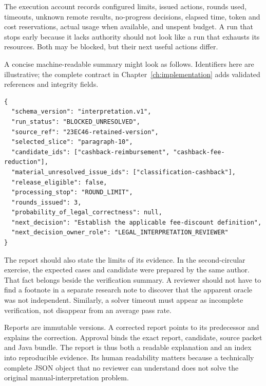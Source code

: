 
The execution account records configured limits, issued actions, rounds used,
timeouts, unknown remote results, no-progress decisions, elapsed time, token and
cost reservations, actual usage when available, and unspent budget. A run that
stops early because it lacks authority should not look like a run that exhausts
its resources. Both may be blocked, but their next useful actions differ.

A concise machine-readable summary might look as follows. Identifiers here are
illustrative; the complete contract in Chapter~\ref{ch:implementation} adds
validated references and integrity fields.

\begin{lstlisting}[caption={A blocked result preserves alternatives and the next decision.}]
{
  "schema_version": "interpretation.v1",
  "run_status": "BLOCKED_UNRESOLVED",
  "source_ref": "23EC46-retained-version",
  "selected_slice": "paragraph-10",
  "candidate_ids": ["cashback-reimbursement", "cashback-fee-reduction"],
  "material_unresolved_issue_ids": ["classification-cashback"],
  "release_eligible": false,
  "processing_stop": "ROUND_LIMIT",
  "rounds_issued": 3,
  "probability_of_legal_correctness": null,
  "next_decision": "Establish the applicable fee-discount definition",
  "next_decision_owner_role": "LEGAL_INTERPRETATION_REVIEWER"
}
\end{lstlisting}

The report should also state the limits of its evidence. In the second-circular
exercise, the expected cases and candidate were prepared by the same author.
That fact belongs beside the verification summary. A reviewer should not have to
find a footnote in a separate research note to discover that the apparent oracle
was not independent. Similarly, a solver timeout must appear as incomplete
verification, not disappear from an average pass rate.

Reports are immutable versions. A corrected report points to its predecessor and
explains the correction. Approval binds the exact report, candidate, source
packet and Java bundle. The report is thus both a readable explanation and an
index into reproducible evidence. Its human readability matters because a
technically complete JSON object that no reviewer can understand does not solve
the original manual-interpretation problem.


